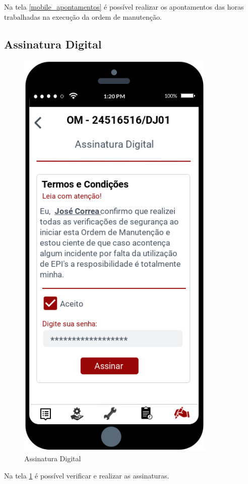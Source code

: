 Na tela \ref{mobile_apontamentos} é possível realizar os apontamentos das horas trabalhadas na execução da ordem de manutenção.

\newpage
\subsection{Assinatura Digital}

\begin{figure}[htb]
	\caption{\label{mobile_assinaturas}Assinatura Digital}
	\begin{center}
		\includegraphics[scale=0.80]{./Figuras/mobile/assinaturas.png}
	\end{center}
\end{figure}

Na tela \ref{mobile_assinaturas} é possível verificar e realizar as assinaturas.